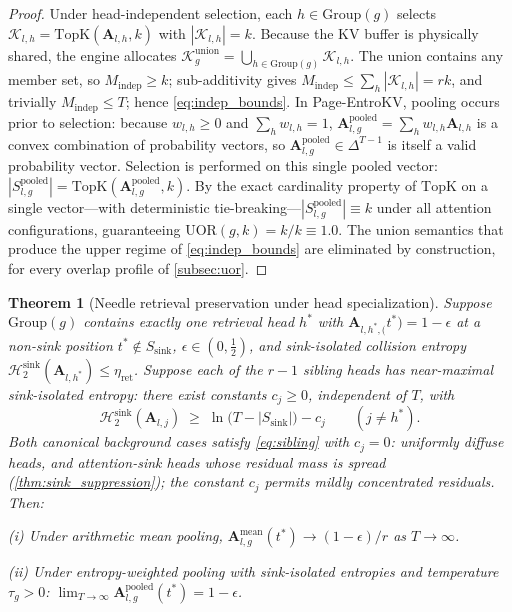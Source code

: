 \documentclass[final,5p,times,twocolumn]{elsarticle}
\newtheorem{theorem}{Theorem}
\theoremstyle{definition}
\theoremstyle{remark}
\newcommand{\method}{Page-EntroKV}
\newcommand{\Attn}[2]{\mathbf{A}_{#1,#2}}
\newcommand{\AttnPool}[2]{\mathbf{A}^{\mathrm{pooled}}_{#1,#2}}
\newcommand{\AttnMean}[2]{\mathbf{A}^{\mathrm{mean}}_{#1,#2}}
\newcommand{\CollisionSink}[1]{\mathcal{H}^{\mathrm{sink}}_{2}\!\left(#1\right)}
\newcommand{\UOR}{\mathrm{UOR}}
\newcommand{\Group}[1]{\mathrm{Group}(#1)}
\newcommand{\TokSet}[1]{\mathcal{K}_{l,#1}}
\newcommand{\Ssink}{S_{\mathrm{sink}}}
\begin{document}
\begin{proof}
Under head-independent selection, each $h \in \Group{g}$ selects
$\TokSet{h} = \mathrm{TopK}(\Attn{l}{h}, k)$ with $|\TokSet{h}| = k$. Because
the KV buffer is physically shared, the engine allocates
$\mathcal{K}^{\mathrm{union}}_{g} = \bigcup_{h \in \Group{g}} \TokSet{h}$.
The union contains any member set, so $M_{\mathrm{indep}} \ge k$;
sub-additivity gives $M_{\mathrm{indep}} \le \sum_{h} |\TokSet{h}| = rk$, and
trivially $M_{\mathrm{indep}} \le T$; hence \cref{eq:indep_bounds}.
In \method{}, pooling occurs prior to selection: because
$w_{l,h} \ge 0$ and $\sum_{h} w_{l,h} = 1$,
$\AttnPool{l}{g} = \sum_{h} w_{l,h} \Attn{l}{h}$ is a convex combination of
probability vectors, so $\AttnPool{l}{g} \in \Delta^{T-1}$ is itself a
valid probability vector. Selection is performed on this single pooled
vector: $|S^{\mathrm{pooled}}_{l,g}| = \mathrm{TopK}(\AttnPool{l}{g}, k)$.
By the exact cardinality property of $\mathrm{TopK}$ on a single
vector---with deterministic tie-breaking---$|S^{\mathrm{pooled}}_{l,g}| \equiv k$ under all attention configurations, guaranteeing
$\UOR(g, k) = k/k \equiv 1.0$. The union semantics that produce the
upper regime of \cref{eq:indep_bounds} are eliminated by construction,
for every overlap profile of \cref{subsec:uor}.
\end{proof}

\begin{theorem}[Needle retrieval preservation under head
  specialization]
\label{thm:needle_preservation}
Suppose $\Group{g}$ contains exactly one retrieval head $h^{*}$ with
 $\Attn{l,h^{*}}(t^{*})=1-\epsilon$ at a non-sink position
 $t^{*}\notin\Ssink$, $\epsilon\in(0,\tfrac{1}{2})$, and sink-isolated
collision entropy
 $\CollisionSink{\Attn{l}{h^{*}}}\le\eta_{\mathrm{ret}}$. Suppose each
of the $r-1$ sibling heads has near-maximal sink-isolated entropy:
there exist constants $c_j\ge 0$, independent of $T$, with
\begin{equation}\label{eq:sibling}
  \CollisionSink{\Attn{l}{j}}
  \;\ge\; \ln\!\bigl(T-|\Ssink|\bigr)-c_j
  \qquad (j\neq h^{*}).
\end{equation}
Both canonical background cases satisfy \cref{eq:sibling} with
 $c_j=0$: uniformly diffuse heads, and attention-sink heads whose
residual mass is spread (\cref{thm:sink_suppression}); the constant
 $c_j$ permits mildly concentrated residuals. Then:

\textup{(i)} Under arithmetic mean pooling,
 $\AttnMean{l}{g}(t^{*})\to(1-\epsilon)/r$ as $T\to\infty$.

\textup{(ii)} Under entropy-weighted pooling with sink-isolated
entropies and temperature $\tau_g>0$:
 $\lim_{T\to\infty}\AttnPool{l}{g}(t^{*})=1-\epsilon$.
\end{theorem}
\end{document}
